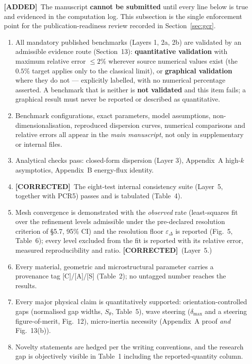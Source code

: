 \documentclass[11pt,a4paper]{article}
\newcommand{\ADDED}{{\color{addcol}\textbf{[ADDED]}}}
\newcommand{\COR}{{\color{corcol}\textbf{[CORRECTED]}}}
\begin{document}
\ADDED\ The manuscript \textbf{cannot be submitted} until every line below is true and
evidenced in the computation log. This subsection is the single enforcement point for
the publication-readiness review recorded in Section~\ref{sec:gcr}.

\begin{enumerate}[label=\textbf{PCR\arabic*.}]
\item All mandatory published benchmarks (Layers 1, 2a, 2b) are validated by an admissible
evidence route (Section~13): \textbf{quantitative validation} with maximum relative error
$\le2\%$ wherever source numerical values exist (the $0.5\%$ target applies only to the
classical limit), or \textbf{graphical validation} where they do not --- explicitly labelled,
with no numerical percentage asserted. A benchmark that is neither is \textbf{not validated}
and this item fails; a graphical result must never be reported or described as quantitative.
\item Benchmark configurations, exact parameters, model assumptions, non-dimensionalisation,
reproduced dispersion curves, numerical comparisons and relative errors all appear in the
\emph{main manuscript}, not only in supplementary or internal files.
\item Analytical checks pass: closed-form dispersion (Layer 3), Appendix~A high-$k$
asymptotics, Appendix~B energy-flux identity.
\item \COR\ The eight-test internal consistency suite (Layer~5, together with PCR5) passes and is tabulated (Table~4).
\item Mesh convergence is demonstrated with the \emph{observed} rate (least-squares fit over the refinement levels admissible under the pre-declared resolution criterion of \S5.7, 95\% CI) and the resolution floor $\varepsilon_\Delta$ is reported (Fig.~5, Table~6); every level excluded from the fit is reported with its relative error, measured reproducibility and ratio. \COR\ (Layer~5.)
\item Every material, geometric and microstructural parameter carries a provenance tag
[C]/[A]/[S] (Table~2); no untagged number reaches the results.
\item Every major physical claim is quantitatively supported: orientation-controlled gaps
(normalised gap widths, $S_\theta$, Table~5), wave steering ($\delta_{\max}$ and a steering
figure-of-merit, Fig.~12), micro-inertia necessity (Appendix~A proof \emph{and} Fig.~13(b)).
\item Novelty statements are hedged per the writing conventions, and the research gap is
objectively visible in Table~1 including the reported-quantity column.
\end{enumerate}
\end{document}
